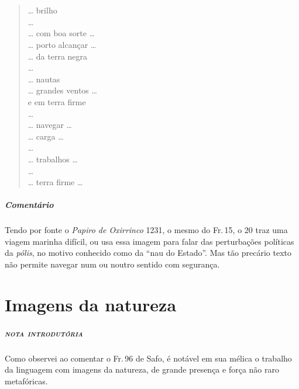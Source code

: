 \chapter*{}
\section*{}


\begin{verse}
\ldots{} brilho\\
\ldots{}\\
\ldots{} com boa sorte \ldots{}\\
\ldots{} porto alcançar \ldots{} \\
\ldots{} da terra negra\\
\ldots{} \\
\ldots{} nautas\\
\ldots{} grandes ventos \ldots{}\\
e em terra firme\\
\ldots{}\\
\ldots{} navegar \ldots{}\\
\ldots{} carga \ldots{}\\
\ldots{}\\
\ldots{} trabalhos \ldots{}\\
\ldots{}\\
\ldots{} terra firme \ldots{}
\end{verse}

\medskip

{\paragraph{Comentário} Tendo por fonte o \textit{Papiro de Oxirrinco} 1231, o mesmo do Fr.\,15, o 20 traz uma viagem marinha difícil, ou usa essa imagem para falar das perturbações políticas da \textit{pólis}, no motivo conhecido como da ``nau do Estado''. Mas tão precário texto não permite navegar num ou noutro sentido com segurança.}

\chapter{Imagens da natureza}

\paragraph{\textsc{nota introdutória}}
Como observei ao comentar o Fr.\,96 de Safo, é notável em sua mélica o trabalho
da linguagem com imagens da natureza, de grande presença e força não raro
metafóricas.

